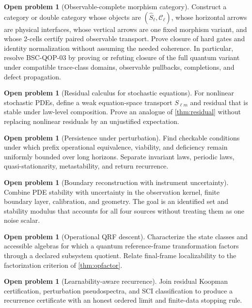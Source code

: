\documentclass[11pt,a4paper]{article}
\theoremstyle{definition}
\newtheorem{openproblem}[definition]{Open problem}
\theoremstyle{plain}
\theoremstyle{remark}
\begin{document}
\begin{openproblem}[Observable-complete morphism category]
Construct a category or double category whose objects are
\((\widehat S_\ell,\mathscr C_\ell)\), whose horizontal arrows are physical
interfaces, whose vertical arrows are one fixed morphism variant, and whose
2-cells certify paired observable transport.  Prove closure of hard gates and
identity normalization without assuming the needed coherence.  In particular,
resolve BSC-QOP-03 by proving or refuting closure of the full quantum variant
under compatible trace-class domains, observable pullbacks, completions, and
defect propagation.
\end{openproblem}

\begin{openproblem}[Residual calculus for stochastic equations]
For nonlinear stochastic PDEs, define a weak equation-space transport
\(S_{\ell m}\) and residual that is stable under law-level composition.  Prove
an analogue of \cref{thm:residual} without replacing nonlinear residuals by an
unjustified expectation.
\end{openproblem}

\begin{openproblem}[Persistence under perturbation]
Find checkable conditions under which prefix operational equivalence,
viability, and deficiency remain uniformly bounded over long horizons.
Separate invariant laws, periodic laws, quasi-stationarity, metastability, and
return recurrence.
\end{openproblem}

\begin{openproblem}[Boundary reconstruction with instrument uncertainty]
Combine PDE stability with uncertainty in the observation kernel, finite
boundary layer, calibration, and geometry.  The goal is an identified set and
stability modulus that accounts for all four sources without treating them as
one noise scalar.
\end{openproblem}

\begin{openproblem}[Operational QRF descent]
Characterize the state classes and accessible algebras for which a quantum
reference-frame transformation factors through a declared subsystem quotient.
Relate final-frame localizability to the factorization criterion of
\cref{thm:opfactor}.
\end{openproblem}

\begin{openproblem}[Learnability-aware recurrence]
Join residual Koopman certification, perturbation pseudospectra, and SCI
classification to produce a recurrence certificate with an honest ordered
limit and finite-data stopping rule.
\end{openproblem}
\end{document}
